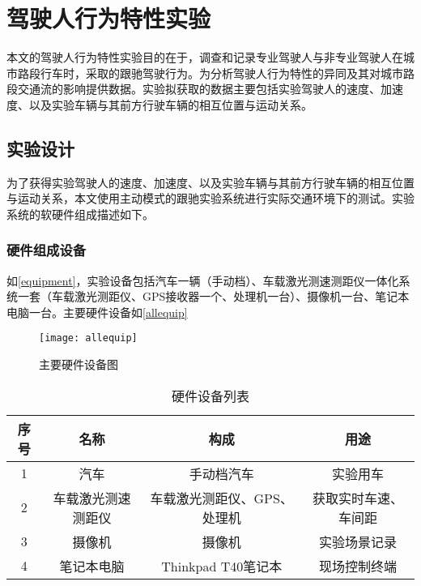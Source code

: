 \chapter{驾驶人行为特性实验}



本文的驾驶人行为特性实验目的在于，调查和记录专业驾驶人与非专业驾驶人在城市路段行车时，采取的跟驰驾驶行为。为分析驾驶人行为特性的异同及其对城市路段交通流的影响提供数据。实验拟获取的数据主要包括实验驾驶人的速度、加速度、以及实验车辆与其前方行驶车辆的相互位置与运动关系。



\section{实验设计}
为了获得实验驾驶人的速度、加速度、以及实验车辆与其前方行驶车辆的相互位置与运动关系，本文使用主动模式的跟驰实验系统进行实际交通环境下的测试。实验系统的软硬件组成描述如下。
\subsection{硬件组成设备}
如\autoref{equipment}，实验设备包括汽车一辆（手动档）、车载激光测速测距仪一体化系统一套（车载激光测距仪、GPS接收器一个、处理机一台）、摄像机一台、笔记本电脑一台。主要硬件设备如\autoref{allequip}

\begin{figure}[htpb]
\centering
\texttt{[image: allequip]}
\caption{主要硬件设备图}
\label{allequip}
\end{figure}

\begin{table}[htbp]
 \centering
 \caption{硬件设备列表}
 \begin{tabular}{cccc}
   \addlinespace
    \toprule
    序号 & 名称  & 构成 & 用途 \\
    \midrule
	1 & 汽车 & 手动档汽车 & 实验用车 \\
	2 & 车载激光测速测距仪 & 车载激光测距仪、GPS、处理机 & 获取实时车速、车间距 \\
	3 & 摄像机 & 摄像机 & 实验场景记录 \\
	4 & 笔记本电脑 & Thinkpad T40笔记本 & 现场控制终端 \\
    \bottomrule
    \end{tabular}
  \label{equipment}
\end{table}



